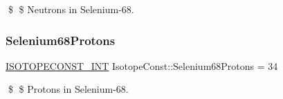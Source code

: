 \$ \$ Neutrons in Selenium-\/68. \mbox{\label{group___isotope_const-_selenium-_se68_ga68b3d30144fb6903f69e1c4c6c58465d}} 
\subsubsection{\texorpdfstring{Selenium68\+Protons}{Selenium68Protons}}
{\footnotesize\ttfamily \mbox{\hyperlink{group___isotope_const-_macros_ga5f18360b3e99483a35c32d789e62621c}{I\+S\+O\+T\+O\+P\+E\+C\+O\+N\+S\+T\+\_\+\+I\+NT}} Isotope\+Const\+::\+Selenium68\+Protons = 34}

\$ \$ Protons in Selenium-\/68. 